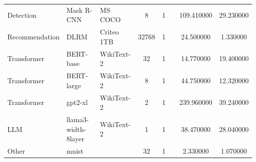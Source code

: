 \begin{table}
\begin{tabular}{lllccccc}
Detection & Mask R-CNN & MS COCO & 8 & 1 &  & 109.410000 & 29.230000 \\
Recommendation & DLRM & Criteo 1TB & 32768 & 1 &  & 24.500000 & 1.330000 \\
Transformer & BERT-base & WikiText-2 & 32 & 1 &  & 14.770000 & 19.400000 \\
Transformer & BERT-large & WikiText-2 & 8 & 1 &  & 44.750000 & 12.320000 \\
Transformer & gpt2-xl & WikiText-2 & 2 & 1 &  & 239.960000 & 39.240000 \\
LLM & llama3-width-8layer & WikiText-2 & 1 & 1 &  & 38.470000 & 28.040000 \\
Other & mnist &  & 32 & 1 &  & 2.330000 & 1.070000 \\
\bottomrule
\end{tabular}
\end{table}
